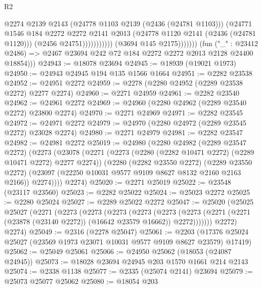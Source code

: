 \begin{lexlean}{R2}
\begin{coremodule}
                                      @2274
                                      @2139
                                      @2143
                                      (@24778 @1103 @2139 (@2436 (@24781 @1103)))
                                      (@24771
                                        @1546
                                        @184
                                        @2272
                                        @2272
                                        @2141
                                        @2013
                                        (@24778 @1120 @2141 (@2436 (@24781 @1120)))
                                        (@2456 @24751)))))))))))
                    (@3694 @145 @2175)))))))
        (fun ("_" : @23412 @2486) =>
        @2467 @23694 @242 @72 @184 @2272 @2272 @2013 @2128 @24400 @18854)))
@24943 := @18078 @23694
@24945 := @18939 (@19021 @1973)
@24950 := @24943 @24945 @194 @135 @1566 @1664
@24951 := @2282 @23538
@24952 := @24951 @2272
@24959 := @2278 (@2280 @24952 (@2289 @23538 @2272) @2277 @2274)
@24960 := @2271 @24959
@24961 := @2282 @23540
@24962 := @24961 @2272
@24969 := @24960 (@2280 @24962 (@2289 @23540 @2272) @23800 @2274)
@24970 := @2271 @24969
@24971 := @2282 @23545
@24972 := @24971 @2272
@24979 := @24970 (@2280 @24972 (@2289 @23545 @2272) @23028 @2274)
@24980 := @2271 @24979
@24981 := @2282 @23547
@24982 := @24981 @2272
@25019 := @24980
    (@2280
      @24982
      (@2289 @23547 @2272)
      (@2273
        (@23078
          (@2271
            (@2273 (@2280 (@2282 @10471 @2272) (@2289 @10471 @2272) @2277 @2274))
            (@2280
              (@2282 @23550 @2272)
              (@2289 @23550 @2272)
              (@23097 (@22250 @10031 @9577 @9109 @8627 @8132 @2160 @2163 @2166))
              @2274))))
      @2274)
@25020 := @2271 @25019
@25022 := @23548 (@23117 @23560)
@25023 := @2282 @25022
@25024 := @25023 @2272
@25025 := @2280 @25024
@25027 := @2289 @25022 @2272
@25047 := @25020
    (@25025
      @25027
      (@2271
        (@2273
          (@2273
            (@2273
              (@2273
                (@2273
                  (@2273 (@2271 (@2271 (@23878 (@23140 @2272)) (@16642 @23579 @16662)) @2272)))))))
        @2272)
      @2274)
@25049 := @2316 (@2278 @25047)
@25061 := @2203 (@17376 @25024 @25027 (@23569 @1973 @23071 @10031 @9577 @9109 @8627 @23579) @17419)
@25062 := @25049 @25061
@25066 := @24950 @25062 (@18053 (@24087 @24945))
@25073 := @18028 @23694 @24945 @203 @1570 @1661 @214 @2143
@25074 := @2338 @1138
@25077 := @2335 (@25074 @2141) @23694
@25079 := @25073 @25077 @25062
@25080 := @18054 @203

\end{coremodule}
\end{lexlean}
